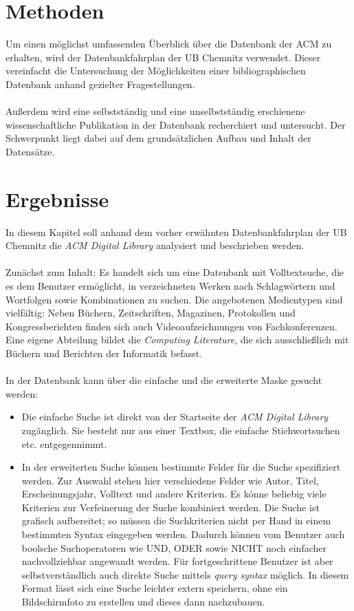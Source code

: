 \documentclass[
	ngerman,
	parskip=half,
	headsepline,
	fontsize=12pt,
	DIV=13,
	listof=leveldown,
	]{scrreprt}
\begin{document}
	\chapter{Methoden}
	Um einen möglichst umfassenden Überblick über die Datenbank der ACM zu erhalten, wird der Datenbankfahrplan der UB Chemnitz \cite{resource:dbf} verwendet. Dieser vereinfacht die Untersuchung der Möglichkeiten einer bibliographischen Datenbank anhand gezielter Fragestellungen.
\ \\	
\ \\
	Außerdem wird eine selbstständig und eine unselbstständig erschienene wissenschaftliche Publikation in der Datenbank recherchiert und untersucht. Der Schwerpunkt liegt dabei auf dem grundsätzlichen Aufbau und Inhalt der Datensätze.
	
	
	\chapter{Ergebnisse}
	In diesem Kapitel soll anhand dem vorher erwähnten Datenbankfahrplan der UB Chemnitz \cite{resource:dbf} die \textsl{ACM Digital Library} analysiert und beschrieben werden.
		\ \\
		\ \\
		Zunächst zum Inhalt: Es handelt sich um eine Datenbank mit Volltextsuche, die es dem Benutzer ermöglicht, in verzeichneten Werken nach Schlagwörtern und Wortfolgen sowie Kombinationen zu suchen. Die angebotenen Medientypen sind vielfältig: Neben Büchern, Zeitschriften, Magazinen, Protokollen und Kongressberichten finden sich auch Videoaufzeichnungen von Fachkonferenzen.
		\ \\
		Eine eigene Abteilung bildet die \textsl{Computing Literature}, die sich ausschließlich mit Büchern und Berichten der Informatik befasst.
		\ \\
		\ \\
		In der Datenbank kann über die einfache und die erweiterte Maske gesucht werden:
		\begin{itemize}
		\item Die einfache Suche ist direkt von der Startseite der \textsl{ACM Digital Library} zugänglich. Sie besteht nur aus einer Textbox, die einfache Stichwortsuchen etc. entgegennimmt.
		\item In der erweiterten Suche können bestimmte Felder für die Suche spezifiziert werden. Zur Auswahl stehen hier verschiedene Felder wie Autor, Titel, Erscheinungsjahr, Volltext und andere Kriterien. Es könne beliebig viele Kriterien zur Verfeinerung der Suche kombiniert werden. Die Suche ist grafisch aufbereitet; so müssen die Suchkriterien nicht per Hand in einem bestimmten Syntax eingegeben werden. Dadurch können vom Benutzer auch boolsche Suchoperatoren wie UND, ODER sowie NICHT noch einfacher nachvollziehbar angewandt werden. Für fortgeschrittene Benutzer ist aber selbstverständlich auch direkte Suche mittels \textit{query syntax} möglich. In diesem Format lässt sich eine Suche leichter extern speichern, ohne ein Bildschirmfoto zu erstellen und dieses dann nachzubauen.
		\end{itemize}
\end{document}
